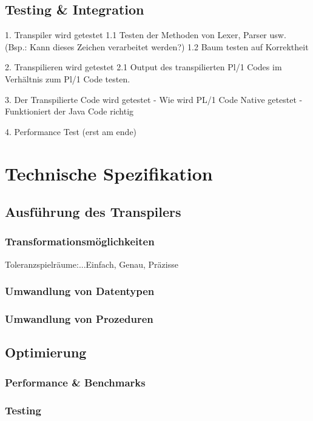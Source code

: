 \subsection{Testing & Integration}
1. Transpiler wird getestet
1.1 Testen der Methoden von Lexer, Parser usw. (Bsp.: Kann dieses Zeichen verarbeitet werden?)
1.2 Baum testen auf Korrektheit

2. Transpilieren wird getestet
2.1 Output des transpilierten Pl/1 Codes im Verhältnis zum Pl/1 Code testen.

3. Der Transpilierte Code wird getestet
- Wie wird PL/1 Code Native getestet
- Funktioniert der Java Code richtig

4. Performance Test (erst am ende)

\section{Technische Spezifikation}
	\subsection{Ausführung des Transpilers}
		\subsubsection{Transformationsmöglichkeiten}
		Toleranzspielräume:...Einfach, Genau, Präzisse
		\subsubsection{Umwandlung von Datentypen}
		\subsubsection{Umwandlung von Prozeduren}
	\subsection{Optimierung}
		\subsubsection{Performance & Benchmarks}
		\subsubsection{Testing}
